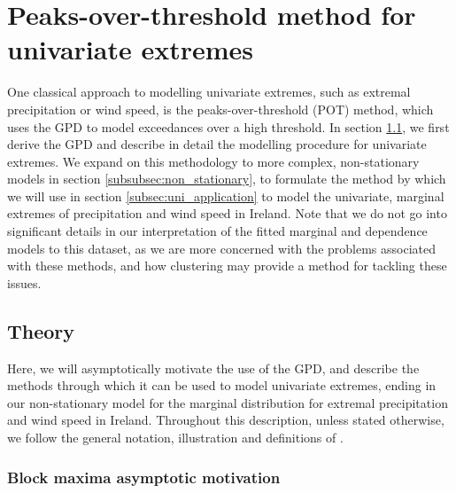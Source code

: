\documentclass{article}
\numberwithin{equation}{section}
\begin{document}
\newpage
\section{Peaks-over-threshold method for univariate extremes}\label{sec:uni}

One classical approach to modelling univariate extremes, such as extremal precipitation or wind speed, is the peaks-over-threshold (POT) method, which uses the GPD to model exceedances over a high threshold.
In section \ref{subsec:uni_theory}, we first derive the GPD and describe in detail the modelling procedure for univariate extremes.
We expand on this methodology to more complex, non-stationary models in section \ref{subsubsec:non_stationary}, to formulate the method by which we will use in section \ref{subsec:uni_application} to model the univariate, marginal extremes of precipitation and wind speed in Ireland.
Note that we do not go into significant details in our interpretation of the fitted marginal and dependence models to this dataset, as we are more concerned with the problems associated with these methods, and how clustering may provide a method for tackling these issues.

\subsection{Theory} \label{subsec:uni_theory}

Here, we will asymptotically motivate the use of the GPD, and describe the methods through which it can be used to model univariate extremes, ending in our non-stationary model for the marginal distribution for extremal precipitation and wind speed in Ireland.
Throughout this description, unless stated otherwise, we follow the general notation, illustration and definitions of \citep{Coles2001}.

\subsubsection{Block maxima asymptotic motivation} \label{subsubsec:asymptotic}

\end{document}
